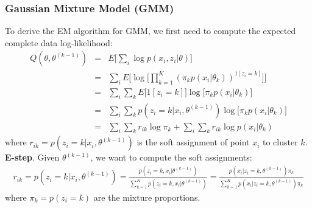 \subsubsection{Gaussian Mixture Model (GMM)}

To derive the EM algorithm for GMM, we first need to compute the expected complete data log-likelihood:
\begin{eqnarray}
    Q(\theta, \theta^{(k-1)}) &=& E\bigg[\sum_i \log p(x_i, z_i|\theta) \bigg] \nonumber \\
    &=& \sum_i E\bigg[ \log \bigg[\prod_{k=1}^{K}(\pi_k p(x_i|\theta_k))^{1[z_i=k]}\bigg]\bigg] \\
    &=& \sum_i \sum_k E\big[1[z_i = k]\big] \log \big[\pi_k p(x_i|\theta_k) \big] \\
    &=& \sum_i \sum_k p(z_i = k|x_i,\theta^{(k-1)}) \log \big[\pi_k p(x_i|\theta_k) \big] \\
    &=& \sum_i \sum_k r_{ik} \log \pi_k + \sum_i \sum_k r_{ik} \log p(x_i|\theta_k)
\end{eqnarray}
where $r_{ik} = p(z_i = k | x_i, \theta^{(k-1)})$ is the soft assignment of point $x_i$ to cluster $k$.\\

\textbf{E-step}. Given $\theta^{(k-1)}$, we want to compute the soft assignments:
\begin{eqnarray}
    r_{ik} = p(z_i=k|x_i, \theta^{(k-1)}) = \frac{p(z_i=k,x_i|\theta^{(k-1)})}{\sum_{k=1}^{K}p(z_i=k,x_i|\theta^{(k-1)})} = \frac{p(x_i|z_i=k, \theta^{(k-1)})\pi_k}{\sum_{k=1}^{K}p(x_i|z_i=k, \theta^{(k-1)})\pi_k}
\end{eqnarray}
where $\pi_k = p(z_i = k)$ are the mixture proportions.\\

